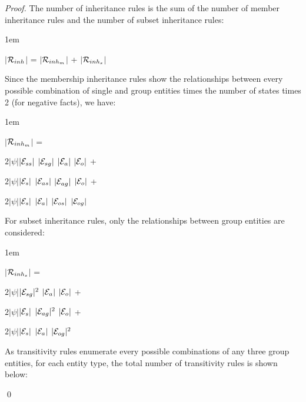 \documentclass[global,twocolumn,draft]{svjour}
\newenvironment{vproof}
  {\begin{proof}\hspace{0.25em}}
  {\qed\end{proof}}
\newenvironment{vquote}
  {\begin{list}{}{\leftmargin 1em}\item[]}
  {\end{list}}
\begin{document}
\begin{vproof}
          The number of inheritance rules is the sum of the number of member
          inheritance rules and the number of subset inheritance rules:

          \begin{vquote}
            $|$${\cal R}_{inh}$$|$ =
            $|$${\cal R}_{inh_{m}}$$|$ +
            $|$${\cal R}_{inh_{s}}$$|$
          \end{vquote}

          Since the membership inheritance rules show the relationships between
          every possible combination of single and group entities times the
          number of states times 2 (for negative facts), we have:

          \begin{vquote}
            $|$${\cal R}_{inh_{m}}$$|$ =

            \hspace{1em}
            $2|\psi|$$|{\cal E}_{ss}|$ $|{\cal E}_{sg}|$ $|{\cal E}_{a}|$ $|{\cal E}_{o}|$ +

            \hspace{1em}
            $2|\psi|$$|{\cal E}_{s}|$ $|{\cal E}_{as}|$ $|{\cal E}_{ag}|$ $|{\cal E}_{o}|$ +

            \hspace{1em}
            $2|\psi|$$|{\cal E}_{s}|$ $|{\cal E}_{a}|$ $|{\cal E}_{os}|$ $|{\cal E}_{og}|$
          \end{vquote}

          For subset inheritance rules, only the relationships between group
          entities are considered:

          \begin{vquote}
            $|$${\cal R}_{inh_{s}}$$|$ =

            \hspace{1em}
            $2|\psi|$$|{\cal E}_{sg}|^{2}$ $|{\cal E}_{a}|$ $|{\cal E}_{o}|$ +

            \hspace{1em}
            $2|\psi|$$|{\cal E}_{s}|$ $|{\cal E}_{ag}|^{2}$ $|{\cal E}_{o}|$ +

            \hspace{1em}
            $2|\psi|$$|{\cal E}_{s}|$ $|{\cal E}_{a}|$ $|{\cal E}_{og}|^{2}$
          \end{vquote}

          As transitivity rules enumerate every possible combinations of any
          three group entities, for each entity type, the total number of
          transitivity rules is shown below:


\end{vproof}
\end{document}
